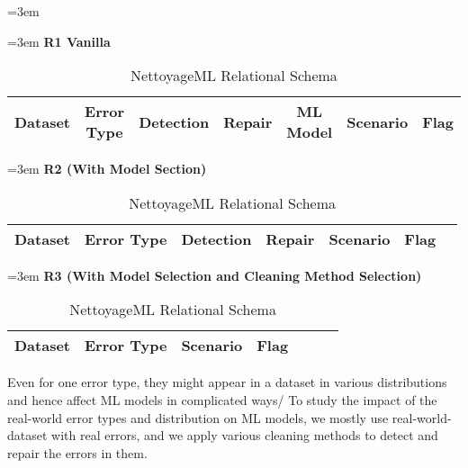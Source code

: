 \begin{table}[H]	
	\leftskip=3em
	\begin{flushleft}
		\leftskip=3em
		\textbf{R1 Vanilla}
	\end{flushleft}
	\begin{tabular}{|c|c|c|c|c|c|c|}
		\hline 
		Dataset & Error Type & Detection & Repair & ML Model & Scenario & Flag \\ 
		\hline 
	\end{tabular} \linebreak	

	\begin{flushleft}
		\leftskip=3em
		\textbf{R2 (With Model Section)}
	\end{flushleft}
	\begin{tabular}{|c|c|c|c|c|c|c|}
		\hline 
		Dataset & Error Type & Detection & Repair & Scenario & Flag \\ 
		\hline 
	\end{tabular} \linebreak

	\begin{flushleft}
		\leftskip=3em
		\textbf{R3 (With Model Selection and Cleaning Method Selection)}
	\end{flushleft}	

	\begin{tabular}{|c|c|c|c|c|c|c|}
		\hline 
		Dataset & Error Type & Scenario & Flag \\ 
		\hline 
	\end{tabular} \linebreak
	\caption{NettoyageML Relational Schema}
	\label{table:nettoyage_ml}
\end{table}

Even for one error type, they might appear in a dataset in various distributions and hence affect ML models in complicated ways/ To study the impact of the real-world error types and distribution on ML models, we mostly use real-world-dataset with real errors, and we apply various cleaning methods to detect and repair the errors in them.


